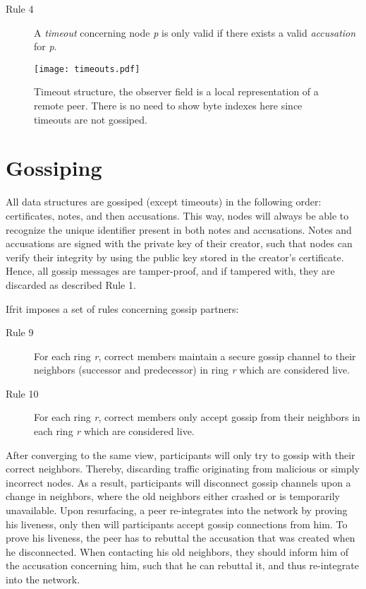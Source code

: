 \documentclass[USenglish]{uit-thesis}
\begin{document}
\begin{description}
	\item[Rule 4] A \textit{timeout} concerning node \textit{p} is only valid if there exists a valid \textit{accusation} for \textit{p}.
\end{description} 

\begin{figure}[h]
	\centering
	\texttt{[image: timeouts.pdf]}
	\caption[Timeout structure.]{Timeout structure, the observer field is a local representation of a remote peer. There is no need to show byte indexes here since timeouts are not gossiped.}
	\label{timeout}
\end{figure}

\section{Gossiping}\label{sec:gossiping}
All data structures are gossiped (except timeouts) in the following order: certificates, notes, and then accusations.
This way, nodes will always be able to recognize the unique identifier present in both notes and accusations.
Notes and accusations are signed with the private key of their creator, such that nodes can verify their integrity by using the public key stored in the creator's certificate. 
Hence, all gossip messages are tamper-proof, and if tampered with, they are discarded as described Rule 1.

Ifrit imposes a set of rules concerning gossip partners:
\begin{description}
	\item[Rule 9] For each ring \textit{r}, correct members maintain a secure gossip channel to their neighbors (successor and predecessor) in ring \textit{r} which are considered live.
	\item[Rule 10] For each ring \textit{r}, correct members only accept gossip from their neighbors in each ring \textit{r} which are considered live.
\end{description} 
After converging to the same view, participants will only try to gossip with their correct neighbors.
Thereby, discarding traffic originating from malicious or simply incorrect nodes.
As a result, participants will disconnect gossip channels upon a change in neighbors, where the old neighbors either crashed or is temporarily unavailable.
Upon resurfacing, a peer re-integrates into the network by proving his liveness, only then will participants accept gossip connections from him.
To prove his liveness, the peer has to rebuttal the accusation that was created when he disconnected.
When contacting his old neighbors, they should inform him of the accusation concerning him, such that he can rebuttal it, and thus re-integrate into the network.
\end{document}
